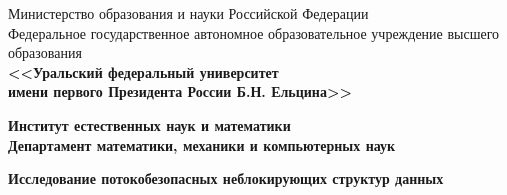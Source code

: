 \documentclass[12pt]{article}
\begin{document}
	
	{\thispagestyle{empty}
		\begin{center}
			\scriptsize Министерство образования и науки Российской Федерации\\
			\scriptsize Федеральное государственное автономное образовательное учреждение высшего образования\\
			\normalsize\bf <<Уральский федеральный университет\\
			\normalsize\bf имени первого Президента России Б.Н. Ельцина>>
		\end{center}
		
		\begin{center}
			\normalsize\bf Институт естественных наук и математики\\
			\normalsize\bf Департамент математики, механики и компьютерных наук\\
		\end{center}
		
		\vspace{3cm}
		
		\begin{center}
			\LARGE\bf Исследование потокобезопасных неблокирующих структур данных
		\end{center}
		
		\vspace{2.5cm}
		
}
\end{document}
